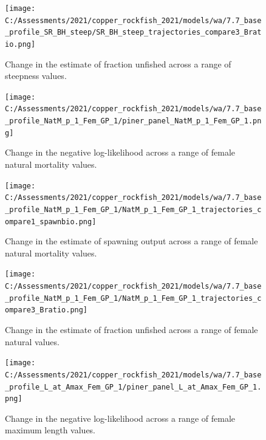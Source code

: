 \documentclass[11pt,
  english,
  a4paper,
]{article}
\begin{document}
\tagmcend\tagstructend


\begin{figure}
\centering
\texttt{[image: C:/Assessments/2021/copper\_rockfish\_2021/models/wa/7.7\_base\_profile\_SR\_BH\_steep/SR\_BH\_steep\_trajectories\_compare3\_Bratio.png]}
\caption{Change in the estimate of fraction unfished across a range of steepness values.\label{fig:h-depl}}
\end{figure}

\tagmcend\tagstructend


\begin{figure}
\centering
\texttt{[image: C:/Assessments/2021/copper\_rockfish\_2021/models/wa/7.7\_base\_profile\_NatM\_p\_1\_Fem\_GP\_1/piner\_panel\_NatM\_p\_1\_Fem\_GP\_1.png]}
\caption{Change in the negative log-likelihood across a range of female natural mortality values.\label{fig:m-profile}}
\end{figure}

\tagmcend\tagstructend


\begin{figure}
\centering
\texttt{[image: C:/Assessments/2021/copper\_rockfish\_2021/models/wa/7.7\_base\_profile\_NatM\_p\_1\_Fem\_GP\_1/NatM\_p\_1\_Fem\_GP\_1\_trajectories\_compare1\_spawnbio.png]}
\caption{Change in the estimate of spawning output across a range of female natural mortality values.\label{fig:m-ssb}}
\end{figure}

\tagmcend\tagstructend


\begin{figure}
\centering
\texttt{[image: C:/Assessments/2021/copper\_rockfish\_2021/models/wa/7.7\_base\_profile\_NatM\_p\_1\_Fem\_GP\_1/NatM\_p\_1\_Fem\_GP\_1\_trajectories\_compare3\_Bratio.png]}
\caption{Change in the estimate of fraction unfished across a range of female natural values.\label{fig:m-depl}}
\end{figure}

\tagmcend\tagstructend


\begin{figure}
\centering
\texttt{[image: C:/Assessments/2021/copper\_rockfish\_2021/models/wa/7.7\_base\_profile\_L\_at\_Amax\_Fem\_GP\_1/piner\_panel\_L\_at\_Amax\_Fem\_GP\_1.png]}
\caption{Change in the negative log-likelihood across a range of female maximum length values.\label{fig:linf-profile}}
\end{figure}
\end{document}
